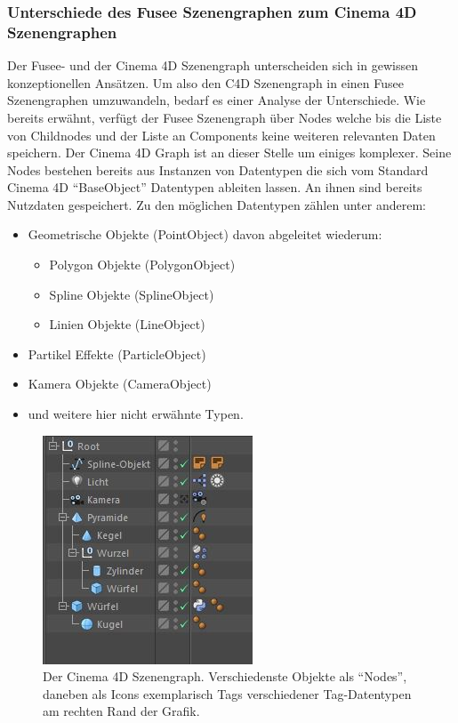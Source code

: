 \documentclass[pagesize, paper=a4, fontsize=12pt, titlepage=true, headings=small, headnosepline, abstractoff, liststotoc, nochapterprefix, plainheadsepline, twoside]{scrreprt}
\begin{document}
\subsubsection{Unterschiede des Fusee Szenengraphen zum Cinema 4D Szenengraphen}
Der Fusee- und der Cinema 4D Szenengraph unterscheiden sich in gewissen konzeptionellen Ansätzen. Um also den C4D Szenengraph in einen Fusee Szenengraphen umzuwandeln, bedarf es einer Analyse der Unterschiede.
Wie bereits erwähnt, verfügt der Fusee Szenengraph über Nodes welche bis die Liste von Childnodes und der Liste an Components keine weiteren relevanten Daten speichern. Der Cinema 4D Graph ist an dieser Stelle um einiges komplexer. Seine Nodes bestehen bereits aus Instanzen von Datentypen die sich vom Standard Cinema 4D “BaseObject” Datentypen ableiten lassen. An ihnen sind bereits Nutzdaten gespeichert. Zu den möglichen Datentypen zählen unter anderem:
\begin{itemize}
\item Geometrische Objekte (PointObject) davon abgeleitet wiederum:
	\begin{itemize}
	\item Polygon Objekte (PolygonObject)
	\item Spline Objekte (SplineObject)
	\item Linien Objekte (LineObject)
	\end{itemize}
\item Partikel Effekte (ParticleObject)
\item Kamera Objekte (CameraObject)
\item und weitere hier nicht erwähnte Typen.
\end{itemize}

\begin{figure}[ht]
	\centering
	\includegraphics{Bilder/c4d_Szenengraph_Vgl.jpg}
	\caption{Der Cinema 4D Szenengraph. Verschiedenste Objekte als “Nodes”, daneben als Icons exemplarisch Tags verschiedener Tag-Datentypen am rechten Rand der Grafik.}
	\label{Cinema 4DSzenenGraph}
\end{figure}
\end{document}
